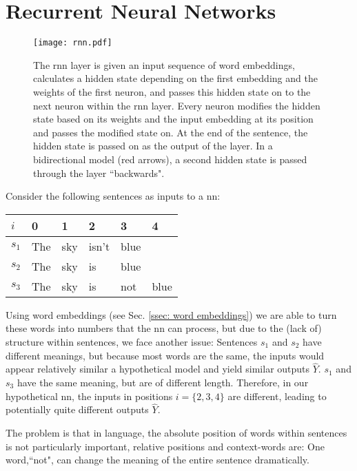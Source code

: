 \section{Recurrent Neural Networks \label{ssec: RNNs}}

    \begin{figure}[t]
        \centering
        \texttt{[image: rnn.pdf]}
        \caption{The \gls{rnn} layer is given an input sequence of word \glspl{embedding}, calculates a hidden state depending on the first \gls{embedding} and the weights of the first neuron, and passes this hidden state on to the next \gls{neuron} within the \gls{rnn} layer. Every \gls{neuron} modifies the hidden state based on its weights and the input \gls{embedding} at its position and passes the modified state on. At the end of the sentence, the hidden state is passed on as the output of the layer. In a bidirectional \gls{model} (red arrows), a second hidden state is passed through the layer ``backwards".}
        \label{fig:rnn}
    \end{figure}
    Consider the following sentences as inputs to a \gls{nn}:

    \begin{table}[H]
    \begin{tabular}{|l|l|l|l|l|l|}
        \hline
        $i$   & 0   & 1   & 2     & 3    & 4    \\ \hline
        $s_1$ & The & sky & isn't & blue &      \\ \hline
        $s_2$ & The & sky & is    & blue &      \\ \hline
        $s_3$ & The & sky & is    & not  & blue \\ \hline
    \end{tabular}
    \centering
    \end{table}
    \noindent Using word \glspl{embedding} (see Sec. \ref{ssec: word embeddings}) we are able to turn these words into numbers that the \gls{nn} can process, but due to the (lack of) structure within sentences, we face another issue:
    Sentences $s_1$ and $s_2$ have different meanings, but because most words are the same, the inputs would appear relatively similar a hypothetical \gls{model} and yield similar outputs $\hat{Y}$. $s_1$ and $s_3$ have the same meaning, but are of different length. Therefore, in our hypothetical \gls{nn}, the inputs in positions $i = \{2, 3, 4\}$ are different, leading to potentially quite different outputs $\hat{Y}$.

    The problem is that in language, the absolute position of words within sentences is not particularly important, relative positions and context-words are: One word,``not", can change the meaning of the entire sentence dramatically.

